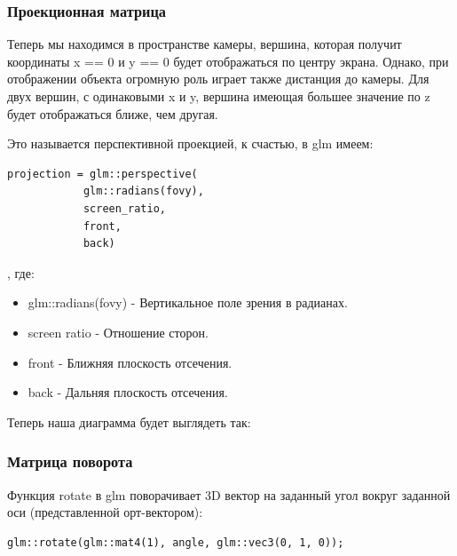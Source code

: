 \documentclass[14pt,a4paper,report]{report}
\begin{document}
\subsubsection{Проекционная матрица}

Теперь мы находимся в пространстве камеры, вершина, которая получит координаты x == 0 и y == 0 будет отображаться по центру экрана. Однако, при отображении объекта огромную роль играет также дистанция до камеры. Для двух вершин, с одинаковыми x и y, вершина имеющая большее значение по z будет отображаться ближе, чем другая.

Это называется перспективной проекцией, к счастью, в glm имеем:
\begin{lstlisting}
projection = glm::perspective(
            glm::radians(fovy),
            screen_ratio,
            front,
            back)
\end{lstlisting}
, где:
\begin{itemize}
\item glm::radians(fovy) - Вертикальное поле зрения в радианах.

\item screen ratio - Отношение сторон.

\item front - Ближняя плоскость отсечения.

\item back - Дальняя плоскость отсечения.

\end{itemize}

Теперь наша диаграмма будет выглядеть так:
\begin{figure}[h!]
\label{ris:image}
\end{figure}

\subsubsection{Матрица поворота}
Функция rotate в glm поворачивает 3D вектор на заданный угол вокруг заданной оси (представленной орт-вектором):
\begin{lstlisting}
glm::rotate(glm::mat4(1), angle, glm::vec3(0, 1, 0));
\end{lstlisting}
\end{document}
